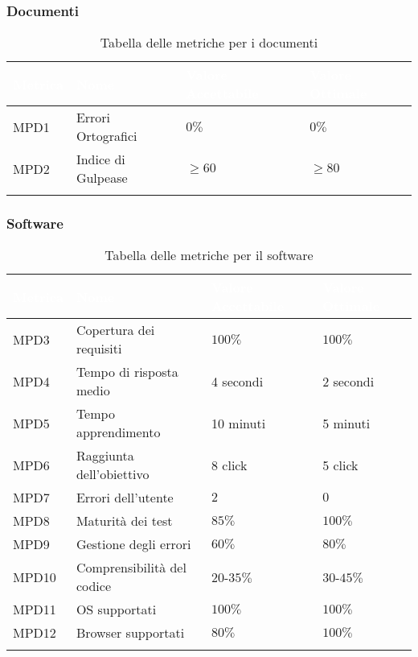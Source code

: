 \subsubsection{Documenti}
\begin{center}
  \renewcommand{\arraystretch}{1.25}
  \begin{longtable}{|p{1.8cm}|p{3.5cm}|p{3.8cm}|p{3.3cm}|} \hline
    \rowcolor[HTML]{036400}
    \textcolor{white}{\textbf{Metrica}} & \textcolor{white}{\textbf{Nome}} & \textcolor{white}{\textbf{Valore Accettabile}} & \textcolor{white}{\textbf{Valore Ottimale}}    \\ \hline
      \rowcolor[HTML]{EFEFEF}
      MPD1 & Errori Ortografici    & $0\%$      & $0\%$        \\ \hline
      \rowcolor[HTML]{C0C0C0}
      MPD2 & Indice di Gulpease    & $\geq60$   & $\geq80$     \\ \hline
      \caption{Tabella delle metriche per i documenti}
  \end{longtable}
\end{center}

\vspace{-2cm}
\subsubsection{Software}
\begin{center}
  \renewcommand{\arraystretch}{1.25}
  \begin{longtable}{|p{1.8cm}|p{4.5cm}|p{3.8cm}|p{3.5cm}|} \hline
    \rowcolor[HTML]{036400}
    \textcolor{white}{\textbf{Metrica}} & \textcolor{white}{\textbf{Nome}} & \textcolor{white}{\textbf{Valore Accettabile}} & \textcolor{white}{\textbf{Valore Ottimale}}   \\ \hline
      MPD3 & Copertura dei requisiti & $100\%$ & $100\%$  \\ \hline
      \rowcolor[HTML]{EFEFEF}
      MPD4 & Tempo di risposta medio    &  4 secondi  &  2 secondi   \\ \hline
      \rowcolor[HTML]{C0C0C0}
      MPD5 & Tempo apprendimento    & 10 minuti  & 5 minuti       \\ \hline
      \rowcolor[HTML]{EFEFEF}
      MPD6 & Raggiunta dell'obiettivo    & 8 click   & 5 click     \\ \hline
      \rowcolor[HTML]{C0C0C0}
      MPD7 & Errori dell'utente    & $2$      & $0$        \\ \hline
      \rowcolor[HTML]{EFEFEF}
      MPD8 & Maturità dei test    & $85\%$ &  $100\%$    \\ \hline
      \rowcolor[HTML]{C0C0C0}
      MPD9 & Gestione degli errori    & $60\%$ & $80\%$     \\ \hline
      \rowcolor[HTML]{EFEFEF}
      MPD10 & Comprensibilità del codice    & $20$-$35\%$ & $30$-$45\%$     \\ \hline
      \rowcolor[HTML]{C0C0C0}
      MPD11 & OS supportati    & $100\%$ & $100\%$     \\ \hline
      \rowcolor[HTML]{EFEFEF}
      MPD12 & Browser supportati    & $80\%$ & $100\%$     \\ \hline
      \caption{Tabella delle metriche per il software}
  \end{longtable}
\end{center}
